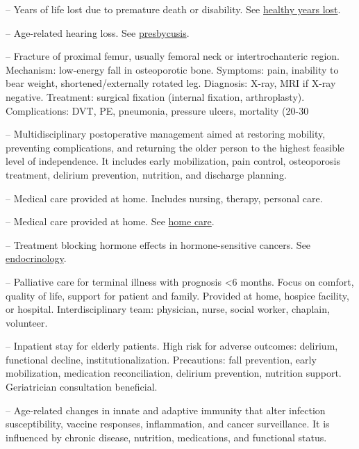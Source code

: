 -- Years of life lost due to premature death or disability. See \hyperlink{Healthy Years Lost}{healthy years lost}.

-- Age-related hearing loss. See \hyperlink{Presbycusis}{presbycusis}.

-- Fracture of proximal femur, usually femoral neck or intertrochanteric region. Mechanism: low-energy fall in osteoporotic bone. Symptoms: pain, inability to bear weight, shortened/externally rotated leg. Diagnosis: X-ray, MRI if X-ray negative. Treatment: surgical fixation (internal fixation, arthroplasty). Complications: DVT, PE, pneumonia, pressure ulcers, mortality (20-30%

-- Multidisciplinary postoperative management aimed at restoring mobility, preventing complications, and returning the older person to the highest feasible level of independence. It includes early mobilization, pain control, osteoporosis treatment, delirium prevention, nutrition, and discharge planning.

-- Medical care provided at home. Includes nursing, therapy, personal care.


-- Medical care provided at home. See \hyperlink{Home Care}{home care}.

-- Treatment blocking hormone effects in hormone-sensitive cancers. See \hyperlink{Endocrinology}{endocrinology}.

-- Palliative care for terminal illness with prognosis <6 months. Focus on comfort, quality of life, support for patient and family. Provided at home, hospice facility, or hospital. Interdisciplinary team: physician, nurse, social worker, chaplain, volunteer.

-- Inpatient stay for elderly patients. High risk for adverse outcomes: delirium, functional decline, institutionalization. Precautions: fall prevention, early mobilization, medication reconciliation, delirium prevention, nutrition support. Geriatrician consultation beneficial.



-- Age-related changes in innate and adaptive immunity that alter infection susceptibility, vaccine responses, inflammation, and cancer surveillance. It is influenced by chronic disease, nutrition, medications, and functional status.

